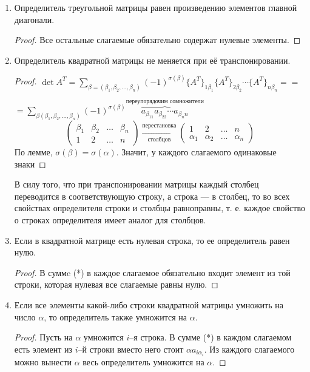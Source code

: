 \begin{enumerate}
\item Определитель треугольной матрицы равен произведению элементов главной диагонали.
\begin{proof}
Все остальные слагаемые обязательно содержат нулевые элементы.
\end{proof}
\item Определитель квадратной матрицы не меняется при её транспонировании.
\begin{proof}
$\det A^T=\sum\limits_{\beta=(\beta_1,\beta_2,\ldots,\beta_n)}(-1)^{\sigma(\beta)}\{A^T\}_{1\beta_1}\{A^T\}_{2\beta_2}\cdots{}\{A^T\}_{n\beta_n}==$

$=\sum\limits_{\beta(\beta_1,\beta_2,\ldots,\beta_n)}
(-1)^{\sigma(\beta)}
\overbrace{a_{\beta_11}a_{\beta_22}\cdots{}a_{\beta_nn}}\limits^{\mbox{переупорядочим сомножители}}$
$$
\begin{pmatrix}
\beta_1 & \beta_2 & \ldots & \beta_n \\
1        & 2        & \ldots & n
\end{pmatrix} \xrightarrow[\mbox{столбцов}]{\mbox{перестановка}}
\begin{pmatrix}
1       & 2       & \ldots & n       \\
\alpha_1 & \alpha_2 & \ldots & \alpha_n
\end{pmatrix}
$$
По лемме, $\sigma(\beta)=\sigma(\alpha)$. Значит, у каждого слагаемого одинаковые знаки
\end{proof}
\begin{remark}
В силу того, что при транспонировании матрицы каждый столбец переводится в соответствующую строку, а строка --- в столбец, то во всех свойствах определителя строки и столбцы равноправны, т. е. каждое свойство о строках определителя имеет аналог для столбцов.
\end{remark}
\item Если в квадратной матрице есть нулевая строка, то ее определитель равен нулю.
\begin{proof}
В суммe (*) в каждое слагаемое обязательно входит элемент из той строки, которая нулевая \then все слагаемые равны нулю.
\end{proof}
\item Если все элементы какой-либо строки квадратной матрицы умножить на число $\alpha$, то определитель также умножится на $\alpha$.
\begin{proof}
Пусть на $\alpha$ умножится $i$--я строка. В сумме (*) в каждом слагаемом есть элемент из $i$--й строки \then вместо него стоит $\alpha{}a_{i\alpha_i}$. Из каждого слагаемого можно вынести $\alpha$ \then весь определитель умножится на $\alpha$.

\end{proof}
\end{enumerate}
